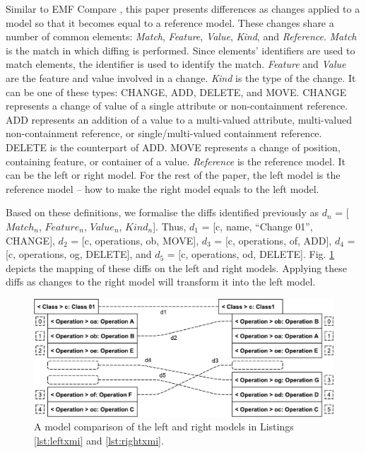 \documentclass{llncs}
\begin{document}
Similar to EMF Compare \cite{emfcompare2018developer}, this paper presents differences as changes applied to a model so that it becomes equal to a reference model. These changes share a number of common elements: \textit{Match}, \textit{Feature}, \textit{Value}, \textit{Kind}, and \textit{Reference}. \textit{Match} is the match in which diffing is performed. Since elements' identifiers are used to match elements, the identifier is used to identify the match. \textit{Feature} and \textit{Value} are the feature and value involved in a change. \textit{Kind} is the type of the change. 
It can be one of these types: \textsf{CHANGE}, \textsf{ADD}, \textsf{DELETE}, and \textsf{MOVE}. \textsf{CHANGE} represents a change of value of a single attribute or non-containment reference. \textsf{ADD} represents an addition of a value to a multi-valued attribute, multi-valued non-containment reference, or single/multi-valued containment reference. \textsf{DELETE} is the counterpart of \textsf{ADD}. \textsf{MOVE} represents a change of position, containing feature, or container of a value. \textit{Reference} is the reference model. It can be the left or right model. For the rest of the paper, the left model is the reference model -- how to make the right model equals to the left model. 
    
Based on these definitions, we formalise the diffs identified previously as $d_n$ = [$Match_n$, $Feature_n$, $Value_n$, $Kind_n$]. Thus, $d_1$ =  [\textsf{c}, \textsf{name}, ``Change 01'', \textsf{CHANGE}], $d_2$ = [\textsf{c}, \textsf{operations}, \textsf{ob}, \textsf{MOVE}], $d_3$ = [\textsf{c}, \textsf{operations}, \textsf{of}, \textsf{ADD}],  $d_4$ = [\textsf{c}, \textsf{operations}, \textsf{og}, \textsf{DELETE}], and $d_5$ = [\textsf{c}, \textsf{operations}, \textsf{od}, \textsf{DELETE}]. Fig. \ref{fig:xmi_comparison} depicts the mapping of these diffs on the left and right models. Applying these diffs as changes to the right model will transform it into the left model.  
 \begin{figure}
     \includegraphics[width=\linewidth]{images/XmiComparison}
     \caption{A model comparison of the left and right models in Listings \ref{lst:leftxmi} and \ref{lst:rightxmi}.}
     \label{fig:xmi_comparison}
 \end{figure}
 
\end{document}
